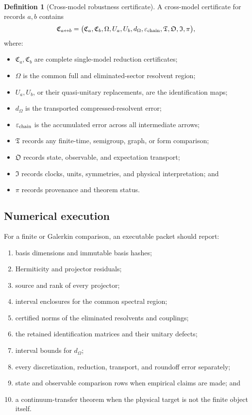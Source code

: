 \documentclass[11pt]{article}
\theoremstyle{definition}
\newtheorem{definition}[theorem]{Definition}
\theoremstyle{remark}
\newcommand{\1}{\mathbf 1}
\begin{document}
\begin{definition}[Cross-model robustness certificate]
A cross-model certificate for records \(a,b\) contains
\[
\mathfrak C_{a\leftrightarrow b}
=
\bigl(
\mathfrak C_a,\mathfrak C_b,
\Omega,
U_a,U_b,
d_\Omega,
\varepsilon_{\rm chain},
\mathfrak T,
\mathfrak O,
\mathfrak I,
\pi
\bigr),
\]
where:
\begin{itemize}[leftmargin=2em]
\item \(\mathfrak C_a,\mathfrak C_b\) are complete single-model reduction
      certificates;
\item \(\Omega\) is the common full and eliminated-sector resolvent region;
\item \(U_a,U_b\), or their quasi-unitary replacements, are the
      identification maps;
\item \(d_\Omega\) is the transported compressed-resolvent error;
\item \(\varepsilon_{\rm chain}\) is the accumulated error across all
      intermediate arrows;
\item \(\mathfrak T\) records any finite-time, semigroup, graph, or form
      comparison;
\item \(\mathfrak O\) records state, observable, and expectation transport;
\item \(\mathfrak I\) records clocks, units, symmetries, and physical
      interpretation; and
\item \(\pi\) records provenance and theorem status.
\end{itemize}
\end{definition}

\subsection{Numerical execution}

For a finite or Galerkin comparison, an executable packet should report:
\begin{enumerate}[leftmargin=2em]
\item basis dimensions and immutable basis hashes;
\item Hermiticity and projector residuals;
\item source and rank of every projector;
\item interval enclosures for the common spectral region;
\item certified norms of the eliminated resolvents and couplings;
\item the retained identification matrices and their unitary defects;
\item interval bounds for \(d_\Omega\);
\item every discretization, reduction, transport, and roundoff error
      separately;
\item state and observable comparison rows when empirical claims are made;
      and
\item a continuum-transfer theorem when the physical target is not the
      finite object itself.
\end{enumerate}
\end{document}
